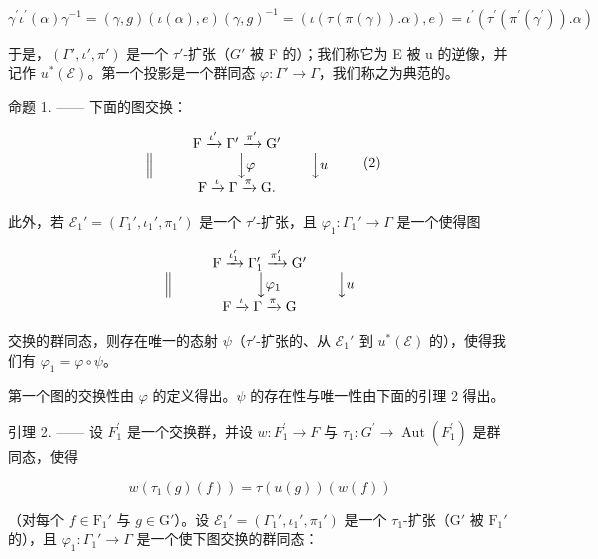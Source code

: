 \[
\gamma^ {\prime} \iota^ {\prime} (\alpha) \gamma^ {- 1} = (\gamma , g) (\iota (\alpha), e) (\gamma , g) ^ {- 1} = (\iota (\tau (\pi (\gamma)). \alpha), e) = \iota^ {\prime} (\tau^ {\prime} (\pi^ {\prime} (\gamma^ {\prime})). \alpha)
\]

于是，\((\Gamma', \iota', \pi')\) 是一个 \(\tau'\)-扩张（\(G'\) 被 F 的）；我们称它为 E 被 u 的逆像，并记作 \(u^{*}(\mathcal{E})\)。第一个投影是一个群同态 \(\varphi : \Gamma' \to \Gamma\)，我们称之为典范的。

命题 1. —— 下面的图交换：

\[
\begin{array}{c} \mathrm{F} \xrightarrow {\iota^ {\prime}} \Gamma^ {\prime} \xrightarrow {\pi^ {\prime}} \mathrm{G} ^ {\prime} \\ \Big \| \qquad \qquad \qquad \Big \downarrow \varphi \qquad \qquad \Big \downarrow u \\ \mathrm{F} \xrightarrow {\iota} \Gamma \xrightarrow {\pi} \mathrm{G}. \end{array}\tag{2}
\]

此外，若 \(\mathcal{E}_1' = (\Gamma_1', \iota_1', \pi_1')\) 是一个 \(\tau'\)-扩张，且 \(\varphi_1: \Gamma_1' \to \Gamma\) 是一个使得图

\[
\begin{array}{c} \mathrm{F} \xrightarrow {\iota_ {1} ^ {\prime}} \Gamma_ {1} ^ {\prime} \xrightarrow {\pi_ {1} ^ {\prime}} \mathrm{G} ^ {\prime} \\ \Big \| \qquad \qquad \qquad \Big \downarrow \varphi_ {1} \qquad \qquad \Big \downarrow u \\ \mathrm{F} \xrightarrow {\iota} \Gamma \xrightarrow {\pi} \mathrm{G} \end{array}
\]

交换的群同态，则存在唯一的态射 \(\psi\)（\(\tau'\)-扩张的、从 \(\mathcal{E}_1'\) 到 \(u^*(\mathcal{E})\) 的），使得我们有 \(\varphi_1 = \varphi \circ \psi\)。

第一个图的交换性由 \(\varphi\) 的定义得出。\(\psi\) 的存在性与唯一性由下面的引理 2 得出。

引理 2. —— 设 \(F_{1}^{\prime}\) 是一个交换群，并设 \(w : F_{1}^{\prime} \to F\) 与 \(\tau_{1}: G^{\prime} \to \operatorname{Aut}(F_{1}^{\prime})\) 是群同态，使得

\[
w (\tau_ {1} (g) (f)) = \tau (u (g)) (w (f))
\]

（对每个 \(f \in \mathrm{F}_1'\) 与 \(g \in \mathrm{G}'\)）。设 \(\mathcal{E}_1' = (\Gamma_1', \iota_1', \pi_1')\) 是一个 \(\tau_1\)-扩张（\(\mathrm{G}'\) 被 \(\mathrm{F}_1'\) 的），且 \(\varphi_1: \Gamma_1' \to \Gamma\) 是一个使下图交换的群同态：

